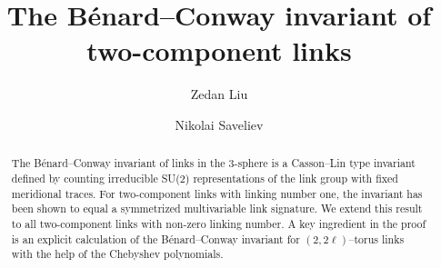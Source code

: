\documentclass[11pt,reqno]{amsart}
\author[Zedan Liu]{Zedan Liu}
\author[Nikolai Saveliev]{Nikolai Saveliev}
\theoremstyle{definition}
\begin{document}
\begin{abstract}
The B{\'e}nard--Conway invariant of links in the 3-sphere is a Casson--Lin type invariant defined by counting irreducible SU(2) representations of the link group with fixed meridional traces. For two-component links with linking number one, the invariant has been shown to equal a symmetrized multivariable link signature. We extend this result to all two-component links with non-zero linking number. A key ingredient in the proof is an explicit calculation of the B{\'e}nard--Conway invariant for $(2,2\ell)$--torus links with the help of the Chebyshev polynomials.
\end{abstract}
\title{The Bénard--Conway invariant of two-component links}

\maketitle
\end{document}
